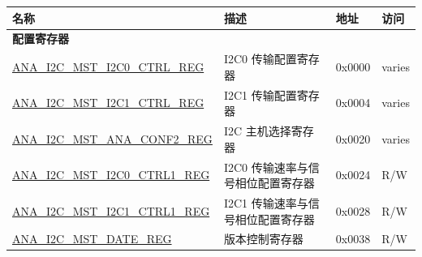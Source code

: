 \begin{longtable}{ | p{6cm} | p{7.2cm} | p{1.3cm} | p{1cm} | }
\hline\rowcolor{lightgray}
名称 & 描述 &  地址 & 访问 \\ \hline
\endhead
\multicolumn{4}{|l|}{\textbf{配置寄存器}} \\ \hline
\hyperref[regdesc:ANAI2CMSTI2C0CTRLREG]{ANA\_I2C\_MST\_I2C0\_CTRL\_REG} & I2C0 传输配置寄存器 & 0x0000 & varies \\ \hline
\hyperref[regdesc:ANAI2CMSTI2C1CTRLREG]{ANA\_I2C\_MST\_I2C1\_CTRL\_REG} & I2C1 传输配置寄存器 & 0x0004 & varies \\ \hline
\hyperref[regdesc:ANAI2CMSTANACONF2REG]{ANA\_I2C\_MST\_ANA\_CONF2\_REG} & I2C 主机选择寄存器 & 0x0020 & varies \\ \hline
\hyperref[regdesc:ANAI2CMSTI2C0CTRL1REG]{ANA\_I2C\_MST\_I2C0\_CTRL1\_REG} & I2C0 传输速率与信号相位配置寄存器 & 0x0024 & R/W \\ \hline
\hyperref[regdesc:ANAI2CMSTI2C1CTRL1REG]{ANA\_I2C\_MST\_I2C1\_CTRL1\_REG} & I2C1 传输速率与信号相位配置寄存器 & 0x0028 & R/W \\ \hline
\hyperref[regdesc:ANAI2CMSTDATEREG]{ANA\_I2C\_MST\_DATE\_REG} & 版本控制寄存器 & 0x0038 & R/W \\ \hline
\end{longtable}
